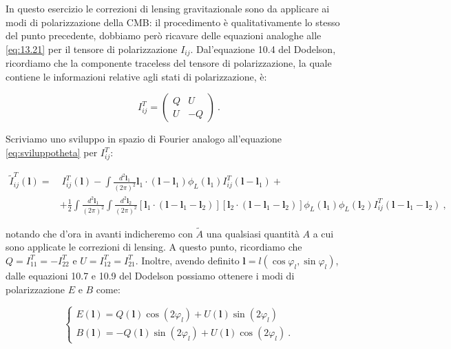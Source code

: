 \documentclass[a4paper,10pt]{article}
\newcommand{\B}{\boldsymbol}
\begin{document}
In questo esercizio le correzioni di lensing gravitazionale sono da applicare ai modi di polarizzazione della CMB: il procedimento è qualitativamente lo stesso del punto precedente, dobbiamo però ricavare delle equazioni analoghe alle \eqref{eq:13.21} per il tensore di polarizzazione $I_{ij}$.
Dal'equazione 10.4 del Dodelson, ricordiamo che la componente traceless del tensore di polarizzazione, la quale contiene le informazioni relative agli stati di polarizzazione, è:

\begin{equation} \label{eq:Iij}
    I_{ij}^T = \begin{pmatrix}
                 Q & U \\
                U & - Q
            \end{pmatrix} \ .
\end{equation} 

Scriviamo uno sviluppo in spazio di Fourier analogo all'equazione \eqref{eq:sviluppotheta} per $I_{ij}^T$:

\begin{equation} \label{eq:sviluppoI}
\begin{aligned}
    \tilde I_{ij}^T(\boldsymbol{l}) = & \ I_{ij}^T(\boldsymbol{l}) - \int \frac{d^2 \B l_1}{(2\pi)^2} \boldsymbol{l}_1 \cdot (\B l - \B l_1) \phi_L(\boldsymbol{l}_1) I_{ij}^T(\B l - \B l_1) + \\
        & + \frac{1}{2} \int \frac{d^2 \B l_1}{(2\pi)^2} \int \frac{d^2 \B l_2}{(2\pi)^2} [\B l_1 \cdot (\B l - \B l_1 - \B l_2)] [\B l_2 \cdot (\B l - \B l_1 - \B l_2)] \phi_L(\B l_1) \phi_L(\B l_2) I_{ij}^T(\B l - \B l_1 - \B l_2) \ ,
\end{aligned}
\end{equation}

notando che d'ora in avanti indicheremo con $\tilde A$ una qualsiasi quantità $A$ a cui sono applicate le correzioni di lensing.
A questo punto, ricordiamo che $Q = I_{11}^T = -I_{22}^T$ e $U = I_{12}^T = I_{21}^T$. Inoltre, avendo definito $\B l = l(\cos \varphi_l, \sin \varphi_l)$, dalle equazioni 10.7 e 10.9 del Dodelson possiamo ottenere i modi di polarizzazione $E$ e $B$ come:

\begin{equation} \label{eq:EB}
\begin{cases}
    E(\B l) = Q(\B l) \cos(2\varphi_l) + U(\B l) \sin(2\varphi_l) \\
    B(\B l) = -Q(\B l) \sin(2\varphi_l) + U(\B l) \cos(2\varphi_l) \ .
\end{cases}
\end{equation}
\end{document}
